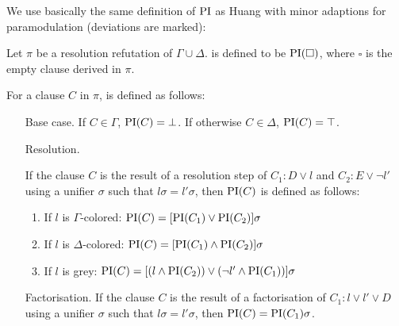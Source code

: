 \documentclass[,%
	paper=a4,%
	DIV14, 
	liststotoc,
	bibtotoc,
	draft=false,%
	numbers=noendperiod
]{scrartcl}
\begin{document}
We use basically the same definition of $\operatorname{PI}$ as Huang with minor adaptions for paramodulation (deviations are marked):
\begin{defi}
  Let $\pi$ be a resolution refutation of $\Gamma \cup \Delta$.
   is defined to be $\operatorname{PI}(\square)$, where $\square$ is the empty clause derived in $\pi$.

  For a clause $C$ in $\pi$,  is defined as follows:
  \label{def:PI}
  \begin{itemize}
    \item[Base case.]
      If $C \in \Gamma$, $\operatorname{PI}(C) = \bot$.
      If otherwise $C \in \Delta$, $\operatorname{PI}(C) = \top$.
    \item[Resolution.]
      \label{def:PI_resolution}

      If the clause $C$ is the result of a resolution step of $C_1: D \lor l$ and $C_2: E \lor \lnot l'$ using a unifier $\sigma$ such that $l\sigma = l'\sigma$, then $\operatorname{PI}(C)$ is defined as follows:
      \begin{enumerate}
        \item If $l$ is $\Gamma$-colored: $\operatorname{PI}(C) = [\operatorname{PI}(C_1) \lor \operatorname{PI}(C_2)]\sigma$
        \item If $l$ is $\Delta$-colored: $\operatorname{PI}(C) = [\operatorname{PI}(C_1) \land \operatorname{PI}(C_2)]\sigma$
        \item If $l$ is grey: $\operatorname{PI}(C) = [(l \land \operatorname{PI}(C_2)) \lor (\lnot l' \land \operatorname{PI}(C_1)) ]\sigma $
      \end{enumerate}

    \item[Factorisation.]
      If the clause $C$ is the result of a factorisation of $C_1: l \lor l' \lor D$ using a unifier $\sigma$ such that $l\sigma = l'\sigma$, then $\operatorname{PI}(C) = \operatorname{PI}(C_1)\sigma$.


\end{itemize}
\end{defi}
\end{document}
